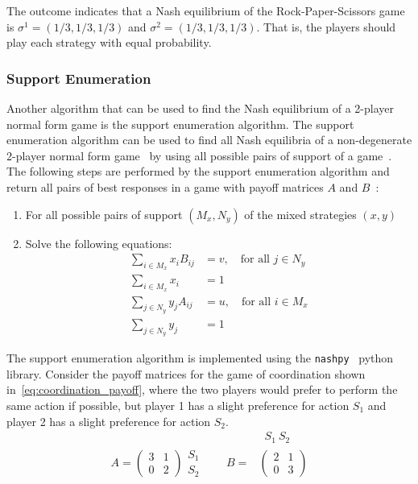 The outcome indicates that a Nash equilibrium of the Rock-Paper-Scissors game
is \(\sigma^1 = (1/3, 1/3, 1/3)\) and \(\sigma^2 = (1/3, 1/3, 1/3)\).
That is, the players should play each strategy with equal probability.


\subsubsection{Support Enumeration}

Another algorithm that can be used to find the Nash equilibrium of a 2-player
normal form game is the support enumeration algorithm.
The support enumeration algorithm can be used to find all Nash equilibria of a
non-degenerate 2-player normal form game~\cite{degenerategames} by using all
possible pairs of support of a game~\cite{myerson1997game}.
The following steps are performed by the support enumeration algorithm and
return all pairs of best responses in a game with payoff matrices \(A\) and
\(B\)~\cite{supportenumeration}:

\begin{enumerate}
    \item For all possible pairs of support \((M_x, N_y)\) of the mixed
    strategies \((x, y)\)
    \item Solve the following equations:
    \begin{align}
        \sum_{i \in M_x} x_i B_{ij} &= v, \quad \text{for all } j \in N_y \\
        \sum_{i \in M_x} x_i &= 1 \\
        \sum_{j \in N_y} y_j A_{ij} &= u, \quad \text{for all } i \in M_x \\
        \sum_{j \in N_y} y_j &= 1
    \end{align}
\end{enumerate}

The support enumeration algorithm is implemented using the
\texttt{nashpy}~\cite{thenashpyproject} python library.
Consider the payoff matrices for the game of coordination shown
in~\eqref{eq:coordination_payoff}, where the two players would prefer to
perform the same action if possible, but player 1 has a slight preference
for action \(S_1\) and player 2 has a slight preference for action \(S_2\).
\begin{align}
    & \ \; S_1 \ S_2 \nonumber \\
    A =
    \begin{pmatrix}
        3 & 1 \\
        0 & 2
    \end{pmatrix}
    \begin{matrix}
        S_1 \\
        S_2
    \end{matrix} \qquad
    B = &
    \begin{pmatrix}
        2 & 1 \\
        0 & 3
    \end{pmatrix}
    \label{eq:coordination_payoff}
\end{align}

